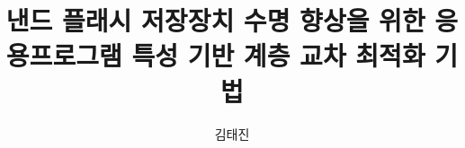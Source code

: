 \documentclass[11pt,b5paper,oneside]{snuthesis-kor}
\title{{\LARGE 낸드 플래시 저장장치 수명 향상을 위한 응용프로그램 특성 기반 계층 교차 최적화 기법}}
\author{김태진}
\begin{document}
\pagestyle{empty}

\maketitle

\makesubmission


\newpage
\pagestyle{plain}
\setcounter{page}{1}




\renewcommand{\contentsname}{Contents}
\renewcommand{\listfigurename}{List of Figures}
\renewcommand{\listtablename}{List of Tables}
\renewcommand{\bibname}{Bibliography}


\tableofcontents

\listoffigures
 
\listoftables


\clearpagebefore
{}
\setcounter{page}{1}







%

\clearpagebefore
{}
{}
\printindex

%

\normalsize
\end{document}

